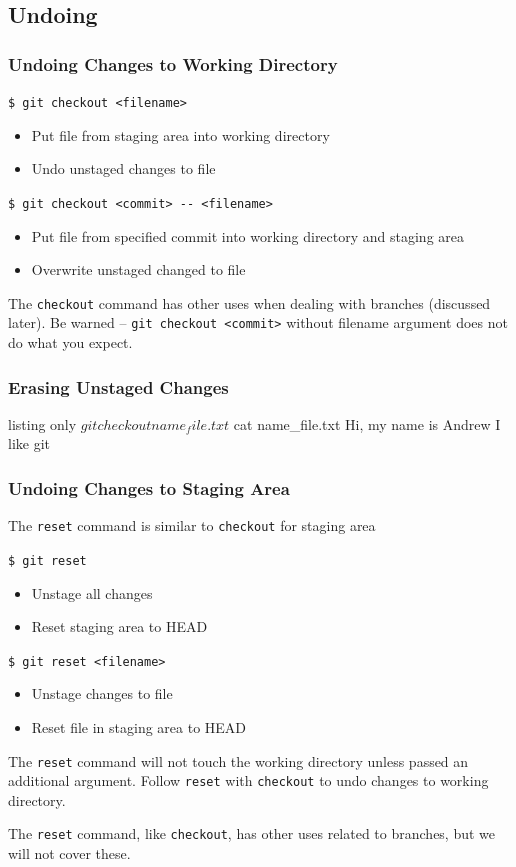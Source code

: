 \documentclass[english,compress]{beamer}
\begin{document}
\subsection{Undoing}
\begin{frame}[fragile]
    \frametitle{Undoing Changes to Working Directory}

    \verb|$ git checkout <filename>|
    \begin{itemize}
        \item Put file from staging area into working directory
        \item Undo unstaged changes to file
    \end{itemize}
    \verb|$ git checkout <commit> -- <filename>|
    \begin{itemize}
        \item Put file from specified commit into working directory and
              staging area
        \item Overwrite unstaged changed to file
    \end{itemize}

    The \verb|checkout| command has other uses when dealing with branches
    (discussed later). Be warned -- \verb|git checkout <commit>| without
    filename argument does not do what you expect.
\end{frame}

\begin{frame}[fragile]
    \frametitle{Erasing Unstaged Changes}
    \begin{tcblisting}{listing only}
$ git checkout name_file.txt
$ cat name_file.txt 
Hi, my name is Andrew
I like git
    \end{tcblisting}
\end{frame}

\begin{frame}[fragile]
    \frametitle{Undoing Changes to Staging Area}

    The \verb|reset| command is similar to \verb|checkout| for staging area

    \verb|$ git reset|
    \begin{itemize}
        \item Unstage all changes
        \item Reset staging area to HEAD
    \end{itemize}
    \verb|$ git reset <filename>|
    \begin{itemize}
        \item Unstage changes to file
        \item Reset file in staging area to HEAD
    \end{itemize}

    The \verb|reset| command will not touch the working directory unless
    passed an additional argument. Follow \verb|reset| with \verb|checkout|
    to undo changes to working directory.

    The \verb|reset| command, like \verb|checkout|, has other uses related
    to branches, but we will not cover these.
\end{frame}
\end{document}
